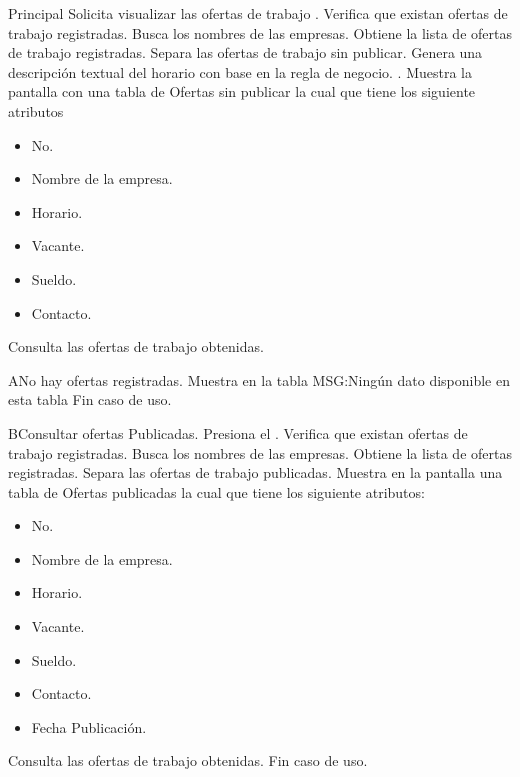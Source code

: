 	\begin{UCtrayectoria}{Principal}
	\UCpaso[\UCactor] Solicita visualizar las ofertas de trabajo .
	\UCpaso Verifica que existan ofertas de trabajo registradas.
	\UCpaso Busca los nombres de las empresas. 
	\UCpaso Obtiene la lista de ofertas de trabajo registradas.
	\UCpaso Separa las ofertas de trabajo sin publicar.	
	\UCpaso Genera una descripción textual del horario con base en la regla de negocio. .
	\UCpaso Muestra la pantalla   con una tabla de Ofertas sin publicar la cual que tiene los siguiente atributos
	\begin{itemize}
	\item No.
	\item Nombre de la empresa.
	\item Horario.
	\item Vacante.
	\item Sueldo.
	\item Contacto.
	\end{itemize}
	\UCpaso[\UCactor] Consulta las ofertas de trabajo obtenidas. 
	\end{UCtrayectoria}

\begin{UCtrayectoriaA}{A}{No hay ofertas registradas.}
	\UCpaso Muestra en la tabla MSG:Ningún dato disponible en esta tabla
	\UCpaso Fin caso de uso.
\end{UCtrayectoriaA}

\begin{UCtrayectoriaB}{B}{Consultar ofertas Publicadas.}
	\UCpaso[\UCactor] Presiona el .
	\UCpaso Verifica que existan ofertas  de trabajo registradas.
	\UCpaso Busca los nombres de las empresas. 
	\UCpaso Obtiene la lista de ofertas registradas.
	\UCpaso Separa las ofertas  de trabajo publicadas.	
	\UCpaso Muestra en la pantalla   una tabla de Ofertas publicadas la cual que tiene los siguiente atributos:
	\begin{itemize}
	\item No.
	\item Nombre de la empresa.
	\item Horario.
	\item Vacante.
	\item Sueldo.
	\item Contacto.
	\item Fecha Publicación.
	\end{itemize}
	\UCpaso[\UCactor] Consulta las ofertas de trabajo obtenidas.
	\UCpaso Fin caso de uso.
\end{UCtrayectoriaB}


	
